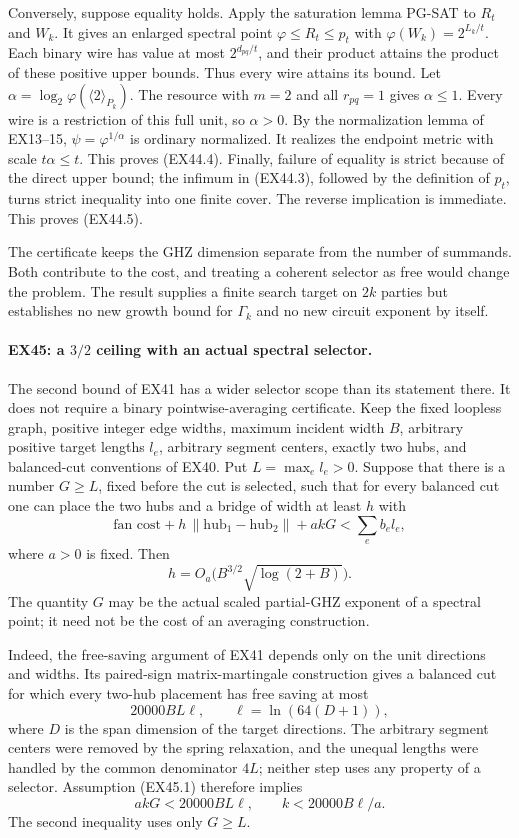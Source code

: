Conversely, suppose equality holds. Apply the saturation lemma
PG-SAT to $R_t$ and $W_k$. It gives an enlarged spectral point
$\varphi\le R_t\le p_t$ with
$\varphi(W_k)=2^{L_k/t}$. Each binary wire has value at most
$2^{d_{pq}/t}$, and their product attains the product of these
positive upper bounds. Thus every wire attains its bound. Let
$\alpha=\log_2\varphi(\langle2\rangle_{P_k})$. The resource with
$m=2$ and all $r_{pq}=1$ gives $\alpha\le1$. Every wire is a
restriction of this full unit, so $\alpha>0$. By the normalization
lemma of EX13--15, $\psi=\varphi^{1/\alpha}$ is ordinary normalized.
It realizes the endpoint metric with scale $t\alpha\le t$.
This proves (EX44.4). Finally, failure of equality is strict because
of the direct upper bound; the infimum in (EX44.3), followed by the
definition of $p_t$, turns strict inequality into one finite cover.
The reverse implication is immediate. This proves (EX44.5).

The certificate keeps the GHZ dimension separate from the number of
summands. Both contribute to the cost, and treating a coherent
selector as free would change the problem. The result supplies a
finite search target on $2k$ parties but establishes no new growth
bound for $\Gamma_k$ and no new circuit exponent by itself.


\paragraph{EX45: a $3/2$ ceiling with an actual spectral selector.}
The second bound of EX41 has a wider selector scope than its statement
there. It does not require a binary pointwise-averaging certificate.
Keep the fixed loopless graph, positive integer edge widths, maximum
incident width $B$, arbitrary positive target lengths $l_e$, arbitrary
segment centers, exactly two hubs, and balanced-cut conventions of
EX40. Put $L=\max_e l_e>0$. Suppose that there is a number $G\ge L$,
fixed before the cut is selected, such that for every balanced cut
one can place the two hubs and a bridge of width at least $h$ with
\[
 \text{fan cost}+h\,\|\text{hub}_1-\text{hub}_2\|+akG
                         <\sum_e b_e l_e,
 \tag{EX45.1}
\]
where $a>0$ is fixed. Then
\[
                 h=O_a\bigl(B^{3/2}\sqrt{\log(2+B)}\bigr).
 \tag{EX45.2}
\]
The quantity $G$ may be the actual scaled partial-GHZ exponent of a
spectral point; it need not be the cost of an averaging construction.

Indeed, the free-saving argument of EX41 depends only on the unit
directions and widths. Its paired-sign matrix-martingale construction
gives a balanced cut for which every two-hub placement has free saving
at most
\[
                  20000BL\ell,\qquad
                  \ell=\ln(64(D+1)),
 \tag{EX45.3}
\]
where $D$ is the span dimension of the target directions. The arbitrary
segment centers were removed by the spring relaxation, and the
unequal lengths were handled by the common denominator $4L$; neither
step uses any property of a selector. Assumption (EX45.1) therefore
implies
\[
                      akG<20000BL\ell,
 \qquad k<20000B\ell/a.
 \tag{EX45.4}
\]
The second inequality uses only $G\ge L$.

